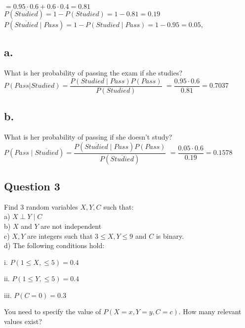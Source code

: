 \documentclass[12pt]{article}
\newcommand\tab[1][1cm]{\hspace*{#1}}
\begin{document}
$= 0.95 \cdot 0.6 + 0.6 \cdot 0.4= 0.81$ \\

$P(\overline{Studied}) = 1 - P(Studied) = 1 - 0.81 = 0.19 $\\

$P(\overline{Studied} \mid Pass) = 1 - P(Studied \mid Pass) = 1 - 0.95 = 0.05$,


\subsection*{a.}
What is her probability of passing the exam if she studies?\\

$P(Pass| Studied) = \dfrac{P(Studied \mid Pass)P(Pass)}{P(Studied)}$ 
$ =  \dfrac{0.95 \cdot 0.6}{0.81} = 0.7037 $

\subsection*{b.}

What is her probability of passing if she doesn't study? \\

$P(Pass \mid \overline{Studied}) = \dfrac{P(\overline{Studied} \mid Pass)P(Pass)}{P(\overline{Studied})}$
$ =  \dfrac{0.05 \cdot 0.6}{0.19} = 0.1578 $

\newpage

\begin{center}
\section*{Question 3}
\end{center}
Find 3 random variables $X, Y, C$ such that:\\


a) $X \perp Y \mid C $\\

b) $X$ and $Y$ are not independent \\

c) $X, Y$ are integers such that $3 \leq X, Y \leq 9$ and $C$ is binary.\\

d) The following conditions hold:

\tab i.  $ P(1 \leq X, \leq 5) = 0.4$

\tab ii.  $ P(1 \leq Y, \leq 5) = 0.4$

\tab iii.  $ P(C=0) = 0.3$

You need to specify the value of $ P(X = x, Y = y, C = c) $. How many relevant values exist?\\
\end{document}
